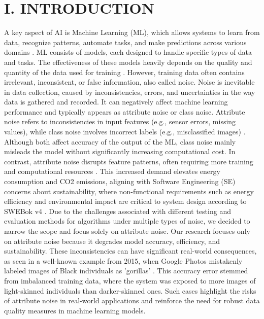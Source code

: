 \documentclass[conference]{IEEEtran}
\begin{document}
\section*{I. INTRODUCTION}
A key aspect of AI is Machine Learning (ML), which allows systems to learn from data, recognize patterns, automate tasks, and make predictions across various domains \cite{google_ai_ml}.
ML consists of models, each designed to handle specific types of data and tasks. The effectiveness of these models heavily depends on the quality and quantity of the data used for training \cite{wuzu}.
However, training data often contains irrelevant, inconsistent, or false information, also called noise.
\newline
\newline
Noise is inevitable in data collection, caused by inconsistencies, errors, and uncertainties in the way data is gathered and recorded. It can negatively affect machine learning performance and typically appears as attribute noise or class noise. Attribute noise refers to inconsistencies in input features (e.g., sensor errors, missing values), while class noise involves incorrect labels (e.g., misclassified images) \cite{dataheroes_noise}. 
\newline
\newline
Although both affect accuracy of the output of the ML, class noise mainly misleads the model without significantly increasing computational cost. In contrast, attribute noise disrupts feature patterns, often requiring more training and computational resources \cite{wuzu}. This increased demand elevates energy consumption and CO2 emissions, aligning with Software Engineering (SE) concerns about sustainability, where non-functional requirements such as energy efficiency and environmental impact are critical to system design according to SWEBok v4 \cite[p. 69]{sweb}.
\newline
\newline
Due to the challenges associated with different testing and evaluation methods for algorithms under multiple types of noise, we decided to narrow the scope and focus solely on attribute noise. Our research focuses only on attribute noise because it degrades model accuracy, efficiency, and sustainability. These inconsistencies can have significant real-world consequences, as seen in a well-known example from 2015, when Google Photos mistakenly labeled images of Black individuals as 'gorillas' \cite{guardian2015}. This accuracy error stemmed from imbalanced training data, where the system was exposed to more images of light-skinned individuals than darker-skinned ones. Such cases highlight the risks of attribute noise in real-world applications and reinforce the need for robust data quality measures in machine learning models.
\end{document}
